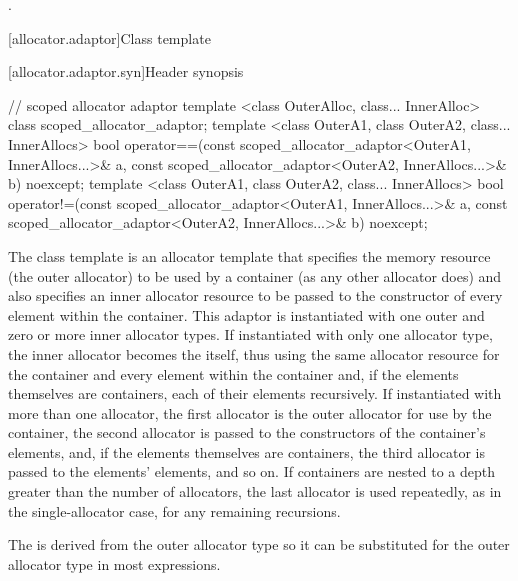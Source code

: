 \begin{itemdescr}
\pnum
\returns
{}.
\end{itemdescr}


[allocator.adaptor]{Class template }

[allocator.adaptor.syn]{Header  synopsis}

%
\begin{codeblock}
  // scoped allocator adaptor
  template <class OuterAlloc, class... InnerAlloc>
    class scoped_allocator_adaptor;
  template <class OuterA1, class OuterA2, class... InnerAllocs>
    bool operator==(const scoped_allocator_adaptor<OuterA1, InnerAllocs...>& a,
                    const scoped_allocator_adaptor<OuterA2, InnerAllocs...>& b) noexcept;
  template <class OuterA1, class OuterA2, class... InnerAllocs>
    bool operator!=(const scoped_allocator_adaptor<OuterA1, InnerAllocs...>& a,
                    const scoped_allocator_adaptor<OuterA2, InnerAllocs...>& b) noexcept;
\end{codeblock}

\pnum
The class template  is an allocator template that
specifies the memory resource (the outer allocator) to be used by a container (as any
other allocator does) and also specifies an inner allocator resource to be passed to the
constructor of every element within the container. This adaptor is instantiated with one
outer and zero or more inner allocator types. If instantiated with only one allocator
type, the inner allocator becomes the  itself, thus
using the same allocator resource for the container and every element within the
container and, if the elements themselves are containers, each of their elements
recursively. If instantiated with more than one allocator, the first allocator is the
outer allocator for use by the container, the second allocator is passed to the
constructors of the container's elements, and, if the elements themselves are
containers, the third allocator is passed to the elements' elements, and so on. If
containers are nested to a depth greater than the number of allocators, the last
allocator is used repeatedly, as in the single-allocator case, for any remaining
recursions. \begin{note} The  is derived from the outer
allocator type so it can be substituted for the outer allocator type in most
expressions. \end{note}

